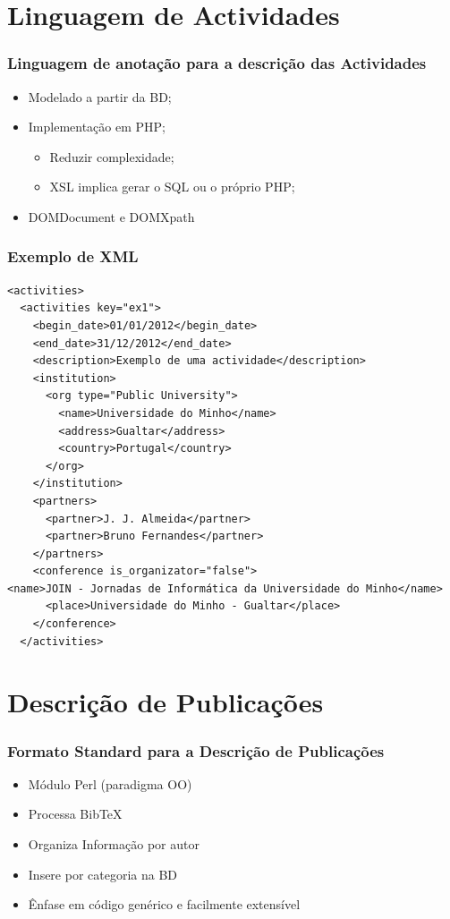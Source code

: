 \documentclass{beamer}
\begin{document}
\section{Linguagem de Actividades}
\begin{frame}
	\frametitle{Linguagem de anotação para a descrição das Actividades}

	\begin{itemize}
		\item Modelado a partir da BD;
		\item Implementação em PHP;
		\begin{itemize}
			\item Reduzir complexidade;
			\item XSL implica gerar o SQL ou o próprio PHP;
		\end{itemize}
		\item DOMDocument e DOMXpath
	\end{itemize}

\end{frame}

\begin{frame}[fragile]
	\frametitle{Exemplo de XML}


\tiny
	\begin{verbatim}
<activities>
  <activities key="ex1">
    <begin_date>01/01/2012</begin_date>
    <end_date>31/12/2012</end_date>
    <description>Exemplo de uma actividade</description>
    <institution>
      <org type="Public University">
        <name>Universidade do Minho</name>
        <address>Gualtar</address>
        <country>Portugal</country>
      </org>
    </institution>
    <partners>
      <partner>J. J. Almeida</partner>
      <partner>Bruno Fernandes</partner>
    </partners>
    <conference is_organizator="false">
<name>JOIN - Jornadas de Informática da Universidade do Minho</name>
      <place>Universidade do Minho - Gualtar</place>
    </conference>
  </activities>
	\end{verbatim}
\normalsize

\end{frame}

\section{Descrição de Publicações}
\begin{frame}
	\frametitle{Formato Standard para a Descrição de Publicações}
	\begin{itemize}
		\item Módulo Perl (paradigma OO)
		\item Processa BibTeX 
		\item Organiza Informação por autor
		\item Insere por categoria na BD
		\item Ênfase em código genérico e facilmente extensível
	\end{itemize}
\end{frame}
\end{document}
